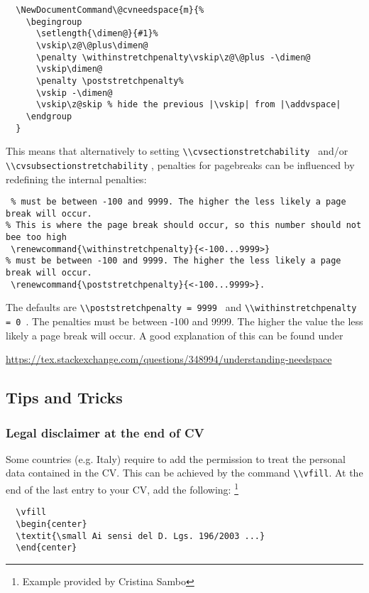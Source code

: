 \documentclass[a4paper,11pt]{article}
\newcommand{\code}[1]{\lstinline!#1!}
\newcommand{\Code}[1]{\lstinline!#1!~} %
\begin{document}
\begin{lstlisting}
  \NewDocumentCommand\@cvneedspace{m}{%
    \begingroup
      \setlength{\dimen@}{#1}%
      \vskip\z@\@plus\dimen@
      \penalty \withinstretchpenalty\vskip\z@\@plus -\dimen@
      \vskip\dimen@
      \penalty \poststretchpenalty%
      \vskip -\dimen@
      \vskip\z@skip % hide the previous |\vskip| from |\addvspace|
    \endgroup
  }
\end{lstlisting}
This means that alternatively to setting \Code{\\cvsectionstretchability} and/or \code{\\cvsubsectionstretchability} , penalties for pagebreaks can be influenced by redefining the internal penalties:
\begin{lstlisting}
 % must be between -100 and 9999. The higher the less likely a page break will occur.
% This is where the page break should occur, so this number should not bee too high
 \renewcommand{\withinstretchpenalty}{<-100...9999>}
% must be between -100 and 9999. The higher the less likely a page break will occur.
 \renewcommand{\poststretchpenalty}{<-100...9999>}.
\end{lstlisting}
The defaults are \Code{\\poststretchpenalty = 9999} and \Code{\\withinstretchpenalty = 0}. 
The penalties must be between -100 and 9999. The higher the value the less likely a page break will occur. A good explanation of this can be found under 
\begin{center}
  \url{https://tex.stackexchange.com/questions/348994/understanding-needspace}
\end{center}



\subsection{Tips and Tricks}
\subsubsection{Legal disclaimer at the end of CV}
Some countries (e.g. Italy) require to add the permission to treat the personal data contained in the CV. This can be achieved by the command \code{\\vfill}. At the end of the last entry to your 
CV, add the following:%
\footnote{Example provided by Cristina Sambo} %
\begin{lstlisting}
  \vfill
  \begin{center} 
  \textit{\small Ai sensi del D. Lgs. 196/2003 ...}
  \end{center}
\end{lstlisting}
\end{document}
